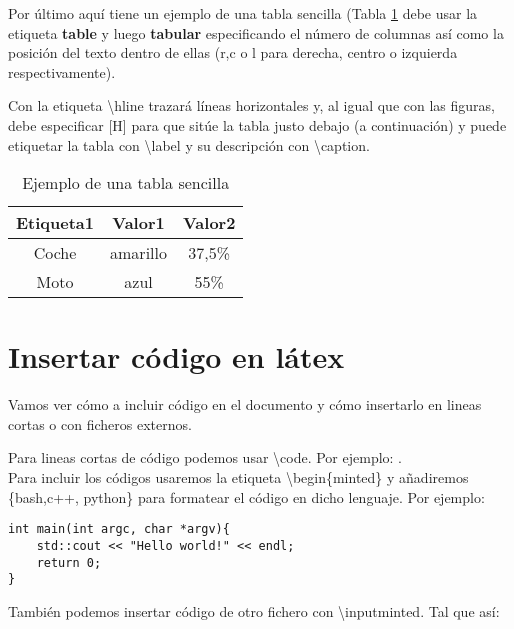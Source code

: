 
Por último aquí tiene un ejemplo de una tabla sencilla (Tabla \ref{tab:tablasencilla} debe usar la etiqueta \textbf{table} y luego \textbf{tabular} especificando el número de columnas así como la posición del texto dentro de ellas (r,c o l para derecha, centro o izquierda respectivamente).

Con la etiqueta \textbackslash hline trazará líneas horizontales y, al igual que con las figuras, debe especificar [H] para que sitúe la tabla justo debajo (a continuación) y puede etiquetar la tabla con \textbackslash label y su descripción con \textbackslash caption.

\begin{table}[H]
	\centering
	\begin{tabular}{|c|c|c|}
		\hline
		\textbf{ Etiqueta1} & \textbf{Valor1} & \textbf{Valor2} \\
		\hline
		Coche & amarillo & 37,5\% \\
		Moto & azul & 55\% \\
		\hline
	\end{tabular}  
	\caption{Ejemplo de una tabla sencilla} \label{tab:tablasencilla}
\end{table}


\section{Insertar código en látex}
Vamos ver cómo a incluir código en el documento y cómo insertarlo en lineas cortas o con ficheros externos.

Para lineas cortas de código podemos usar \textbackslash code. Por ejemplo: . \\

Para incluir los códigos usaremos la etiqueta \textbackslash begin\{minted\} y añadiremos \{bash,c++, python\} para formatear el código en dicho lenguaje. Por ejemplo:
\begin{verbatim}
int main(int argc, char *argv){
	std::cout << "Hello world!" << endl;
	return 0;
}
\end{verbatim}
También podemos insertar código de otro fichero con \textbackslash inputminted. Tal que así:
\inputminted{python}{./code/monitorRAIDs.py}

